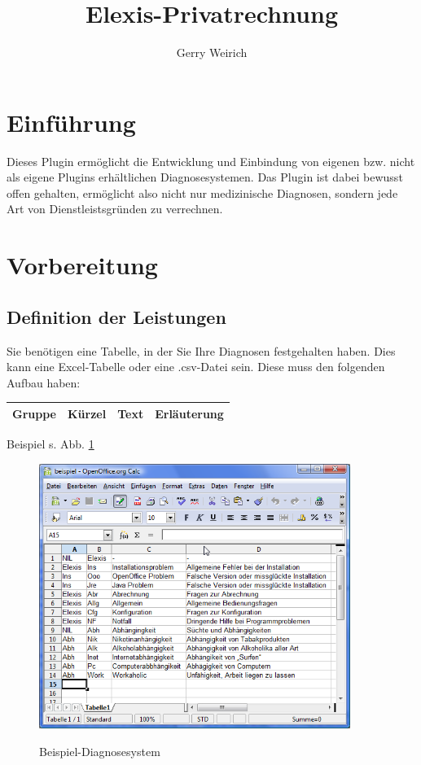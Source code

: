 \documentclass[a4paper]{scrartcl}
\begin{document}
\title{Elexis-Privatrechnung}
\author{Gerry Weirich}
\maketitle

\section{Einführung}
Dieses Plugin ermöglicht die Entwicklung und Einbindung von eigenen bzw. nicht als eigene Plugins erhältlichen Diagnosesystemen. Das Plugin ist dabei bewusst offen gehalten, ermöglicht also nicht nur medizinische Diagnosen, sondern jede Art von Dienstleistsgründen zu verrechnen.

\section{Vorbereitung}
\subsection{Definition der Leistungen}
Sie benötigen eine Tabelle, in der Sie Ihre Diagnosen festgehalten haben. Dies kann eine Excel-Tabelle oder eine .csv-Datei sein. Diese muss den folgenden Aufbau haben:
\medskip
\begin{tabular}[h]{|r|r|r|r|}
\hline Gruppe & Kürzel & Text & Erläuterung\\
\hline
\end{tabular}

\medskip
Beispiel s. Abb. \ref{fig:diag}
\begin{figure}
  \includegraphics[width=0.9\textwidth]{diagnose_1}\\
  \caption{Beispiel-Diagnosesystem}\label{fig:diag}
\end{figure}
\end{document}
